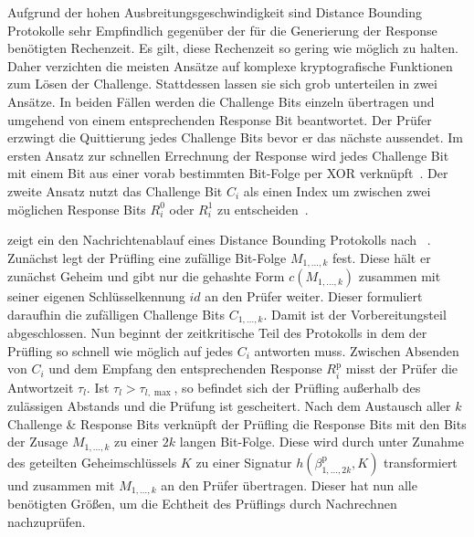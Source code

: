 Aufgrund der hohen Ausbreitungsgeschwindigkeit sind \foreignlanguage{english}{Distance Bounding} Protokolle sehr Empfindlich gegenüber der für die Generierung der \foreignlanguage{english}{Response} benötigten Rechenzeit. Es gilt, diese Rechenzeit so gering wie möglich zu halten. Daher verzichten die meisten Ansätze auf komplexe kryptografische Funktionen zum Lösen der \foreignlanguage{english}{Challenge}. Stattdessen lassen sie sich grob unterteilen in zwei Ansätze. In beiden Fällen werden die \foreignlanguage{english}{Challenge} Bits einzeln übertragen und umgehend von einem entsprechenden \foreignlanguage{english}{Response} Bit beantwortet. Der Prüfer erzwingt die Quittierung jedes \foreignlanguage{english}{Challenge} Bits bevor er das nächste aussendet. Im ersten Ansatz zur schnellen Errechnung der \foreignlanguage{english}{Response} wird jedes \foreignlanguage{english}{Challenge} Bit mit einem Bit aus einer vorab bestimmten Bit-Folge per \foreignlanguage{english}{XOR} verknüpft~\cite{Brands1994}. Der zweite Ansatz nutzt das \foreignlanguage{english}{Challenge} Bit \(C_{i}\) als einen Index um zwischen zwei möglichen \foreignlanguage{english}{Response} Bits \(R_{i}^{0}\) oder \(R_{i}^{1}\) zu entscheiden~\cite{Hancke2005}.

 zeigt ein den Nachrichtenablauf eines \foreignlanguage{english}{Distance Bounding} Protokolls nach \citeauthor{Brands1994}~\cite{Brands1994}. Zunächst legt der Prüfling eine zufällige Bit-Folge \(M_{1, \dots, k}\) fest. Diese hält er zunächst Geheim und gibt nur die gehashte Form \(c(M_{1, \dots, k})\) zusammen mit seiner eigenen Schlüsselkennung \(\mathit{id}\) an den Prüfer weiter. Dieser formuliert daraufhin die zufälligen \foreignlanguage{english}{Challenge} Bits \(C_{1, \dots, k}\). Damit ist der Vorbereitungsteil abgeschlossen. Nun beginnt der zeitkritische Teil des Protokolls in dem der Prüfling so schnell wie möglich auf jedes \(C_{i}\) antworten muss. Zwischen Absenden von \(C_{i}\) und dem Empfang den entsprechenden \foreignlanguage{english}{Response} \(R_{i}^{\mathrm{p}}\) misst der Prüfer die Antwortzeit \(\tau_{l}\). Ist \(\tau_{l} > \tau_{l, \max}\), so befindet sich der Prüfling außerhalb des zulässigen Abstands und die Prüfung ist gescheitert. Nach dem Austausch aller \(k\) \foreignlanguage{english}{Challenge \& Response} Bits verknüpft der Prüfling die \foreignlanguage{english}{Response} Bits mit den Bits der Zusage \(M_{1, \dots, k}\) zu einer \(2k\) langen Bit-Folge. Diese wird durch unter Zunahme des geteilten Geheimschlüssels \(K\) zu einer Signatur \(h(\beta_{1, \dots, 2k}^{\mathrm{p}}, K)\) transformiert und zusammen mit \(M_{1, \dots, k}\) an den Prüfer übertragen. Dieser hat nun alle benötigten Größen, um die Echtheit des Prüflings durch Nachrechnen nachzuprüfen.

